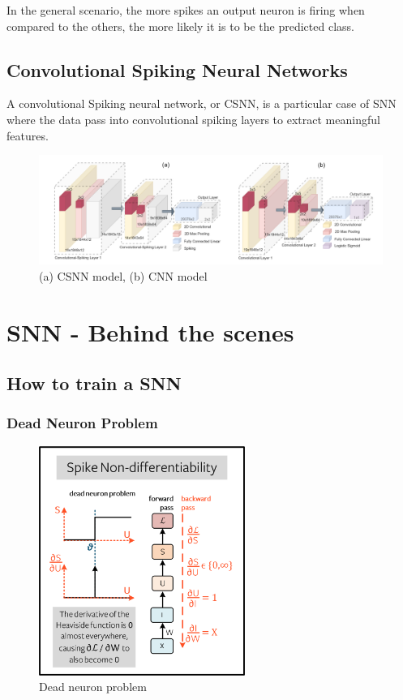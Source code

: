 \documentclass[11pt]{article}
\begin{document}
In the general scenario, the more spikes an output neuron is firing when compared to the others, the more likely it is to be the predicted class. 


\subsection{Convolutional Spiking Neural Networks}

A convolutional Spiking neural network, or CSNN, is a particular case of SNN where the data pass into convolutional spiking layers to extract meaningful features.


\begin{figure}[H]
  \centering
  \includegraphics[width=\textwidth]{./image/csnn_template.png}
  \caption{(a) CSNN model, (b) CNN model}
  \label{fig:csnn_template}
\end{figure}

\pagebreak

\section{SNN - Behind the scenes}

\subsection{How to train a SNN}

\subsubsection{Dead Neuron Problem}

\begin{figure}
  \centering
  \includegraphics[width=0.6\textwidth]{./image/non-differentiability.png}
  \caption{Dead neuron problem\cite{eshraghian2021training}}
\end{figure}
\end{document}
